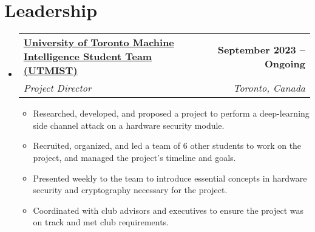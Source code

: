 \documentclass[letterpaper,11pt]{article}
\makeatletter
\let\oldhref\href
\renewcommand{\href}[2]{\oldhref{#1}{\bfseries#2}}
\newcommand{\resumeItem}[1]{
  \item\small{
    {#1 \vspace{-2pt}}
  }
}
\newcommand{\resumeSubheading}[4]{
  \vspace{-2pt}\item
    \begin{tabular*}{1.0\textwidth}[t]{l@{\extracolsep{\fill}}r}
      \textbf{#1} & \textbf{\small #2} \\
      \textit{\small#3} & \textit{\small #4} \\
    \end{tabular*}\vspace{-7pt}
}
\newcommand{\resumeSubHeadingListStart}{\begin{itemize}[leftmargin=0.0in, label={}]}
\newcommand{\resumeSubHeadingListEnd}{\end{itemize}}
\newcommand{\resumeItemListStart}{\begin{itemize}}
\newcommand{\resumeItemListEnd}{\end{itemize}\vspace{-5pt}}
\makeatother
\begin{document}
\section{Leadership}
  \resumeSubHeadingListStart

    \resumeSubheading
      {\href{https://utmist.gitlab.io/projects/side-channel-attacks/}{University of Toronto Machine Intelligence Student Team (UTMIST)}}{September 2023 -- Ongoing}
      {Project Director}{Toronto, Canada}
      \resumeItemListStart
        \resumeItem{Researched, developed, and proposed a project to perform a deep-learning side channel attack on a hardware security module.}
        \resumeItem{Recruited, organized, and led a team of 6 other students to work on the project, and managed the project's timeline and goals.}
        \resumeItem{Presented weekly to the team to introduce essential concepts in hardware security and cryptography necessary for the project.}
        \resumeItem{Coordinated with club advisors and executives to ensure the project was on track and met club requirements.}
      \resumeItemListEnd
    
  \resumeSubHeadingListEnd
\vspace{-16pt}

\end{document}
